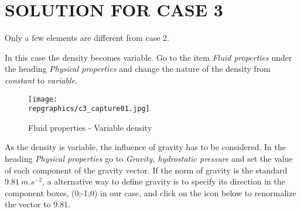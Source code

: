 %
%
%
%
%
%
%
\section{SOLUTION FOR CASE 3}

Only a few elements are different from case 2.

In this case the density becomes variable. Go to the item
{\itshape Fluid properties} under the heading
{\itshape Physical properties} and change the nature of the density from
{\itshape constant} to {\itshape variable}.

\begin{figure}[h!]
\begin{center}
\texttt{[image: \\repgraphics/c3\_capture01.jpg]}
\caption{Fluid properties - Variable density}
\label{fig1_e3}
\end{center}
\end{figure}


\newpage
As the density is variable, the influence of gravity has to be considered. In the
heading {\itshape Physical properties} go to
{\itshape Gravity, hydrostatic pressure} and set the value of each component of
the gravity vector. If the norm of gravity is the standard $9.81\ m.s^{-2}$, a
alternative way to define gravity is to specify its direction in the component
boxes, (0;-1;0) in our case, and click on the icon below to renormalize the
vector to 9.81.

